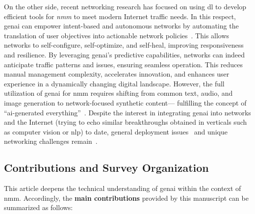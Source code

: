 On the other side, recent networking research has focused on using \gls{dl} to develop efficient tools for \emph{\gls{nmm}} to meet modern Internet traffic needs.
In this respect, \gls{genai} can empower intent-based and autonomous networks by automating the translation of user objectives into actionable network policies~\cite{huang2024digital}.
This allows networks to self-configure, self-optimize, and self-heal, improving responsiveness and resilience. 
By leveraging \gls{genai}'s predictive capabilities, networks can indeed anticipate traffic patterns and issues, ensuring seamless operation. 
This reduces manual management complexity, accelerates innovation, and enhances user experience in a dynamically changing digital landscape. 
However, the full utilization of \gls{genai} for \gls{nmm} requires shifting from common text, audio, and image generation to network-focused synthetic content---%
fulfilling the concept of ``\gls{ai}-generated everything''~\cite{du2024age}.
Despite the interest in integrating \gls{genai} into networks and the Internet (trying to echo similar breakthroughs obtained in verticals such as computer vision or \gls{nlp}) to date, general deployment issues~\cite{lavin2022technology} and unique networking challenges remain~\cite{rossi2022landing}.




\subsection{Contributions and Survey Organization}
%

This article deepens the technical understanding of \gls{genai} within the context of \gls{nmm}. 
Accordingly, the \textbf{main contributions} provided by this manuscript can be summarized as follows:


